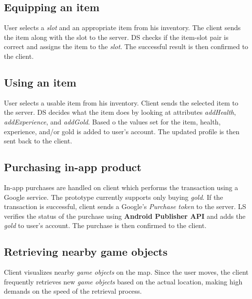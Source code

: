 	\subsection{Equipping an item}
	User selects a \textit{slot} and an appropriate item from his inventory. The client sends the item along with the slot to the server. DS checks if the item-slot pair is correct and assigns the item to the \textit{slot}. The successful result is then confirmed to the client.
	
	\subsection{Using an item}
	User selects a usable item from his inventory. Client sends the selected item to the server. DS decides what the item does by looking at attributes \textit{addHealth}, \textit{addExperience}, and \textit{addGold}. Based o the values set for the item, health, experience, and/or gold is added to user's account. The updated profile is then sent back to the client.
		
	\subsection{Purchasing in-app product}
	In-app purchases are handled on client which performs the transaction using a Google service. The prototype currently supports only buying \textit{gold}. If the transaction is successful, client sends a Google's \textit{Purchase token} to the server. LS verifies the status of the purchase using \textbf{Android Publisher API} \cite{androidpublisher} and adds the \textit{gold} to user's account. The purchase is then confirmed to the client.

	\subsection{Retrieving nearby game objects}
	Client visualizes nearby \textit{game objects} on the map. Since the user moves, the client frequently retrieves new \textit{game objects} based on the actual location, making high demands on the speed of the retrieval process.
	

